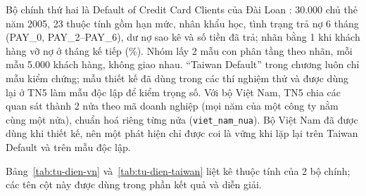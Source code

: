 Bộ chính thứ hai là Default of Credit Card Clients của Đài Loan \parencite{yeh2009default,uciTaiwanDefault2009}: 30.000
chủ thẻ năm 2005, 23 thuộc tính gồm hạn mức, nhân khẩu học, tình trạng trả nợ 6 tháng (PAY\_0, PAY\_2--PAY\_6), dư nợ
sao kê và số tiền đã trả; nhãn bằng 1 khi khách hàng vỡ nợ ở tháng kế tiếp (\soLieuMoTaTaiwanKiemChungNhanMot\%). Nhóm
lấy 2 mẫu con phân tầng theo nhãn, mỗi mẫu 5.000 khách hàng, không giao nhau. ``Taiwan Default'' trong chương luôn chỉ mẫu
kiểm chứng; mẫu thiết kế đã dùng trong các thí nghiệm thử và được dùng lại ở TN5 làm mẫu độc lập để kiểm trọng số. Với bộ
Việt Nam, TN5 chia các quan sát thành 2 nửa theo mã doanh nghiệp (mọi năm của một công ty nằm cùng một nửa), chuẩn hoá
riêng từng nửa (\texttt{viet\_nam\_nua}). Bộ Việt Nam đã được dùng khi thiết kế, nên một phát hiện chỉ được coi là vững
khi lặp lại trên Taiwan Default và trên mẫu độc lập.

Bảng~\ref{tab:tu-dien-vn} và~\ref{tab:tu-dien-taiwan} liệt kê thuộc tính của 2 bộ chính; các tên cột này được dùng
trong phần kết quả và diễn giải.


